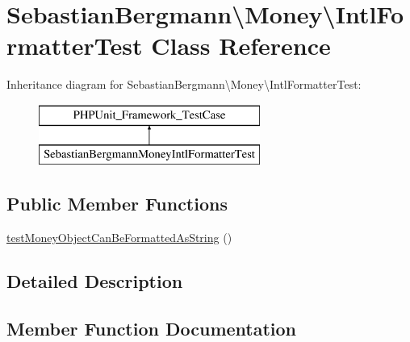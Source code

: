 \hypertarget{classSebastianBergmann_1_1Money_1_1IntlFormatterTest}{}\section{Sebastian\+Bergmann\textbackslash{}Money\textbackslash{}Intl\+Formatter\+Test Class Reference}
\label{classSebastianBergmann_1_1Money_1_1IntlFormatterTest}
Inheritance diagram for Sebastian\+Bergmann\textbackslash{}Money\textbackslash{}Intl\+Formatter\+Test\+:\begin{figure}[H]
\begin{center}
\leavevmode
\includegraphics[height=2.000000cm]{classSebastianBergmann_1_1Money_1_1IntlFormatterTest}
\end{center}
\end{figure}
\subsection*{Public Member Functions}
\begin{DoxyCompactItemize}
\item 
\hyperlink{classSebastianBergmann_1_1Money_1_1IntlFormatterTest_ac597ee0b10671fcabc138226af36fb41}{test\+Money\+Object\+Can\+Be\+Formatted\+As\+String} ()
\end{DoxyCompactItemize}


\subsection{Detailed Description}


\subsection{Member Function Documentation}
\hypertarget{classSebastianBergmann_1_1Money_1_1IntlFormatterTest_ac597ee0b10671fcabc138226af36fb41}{}
